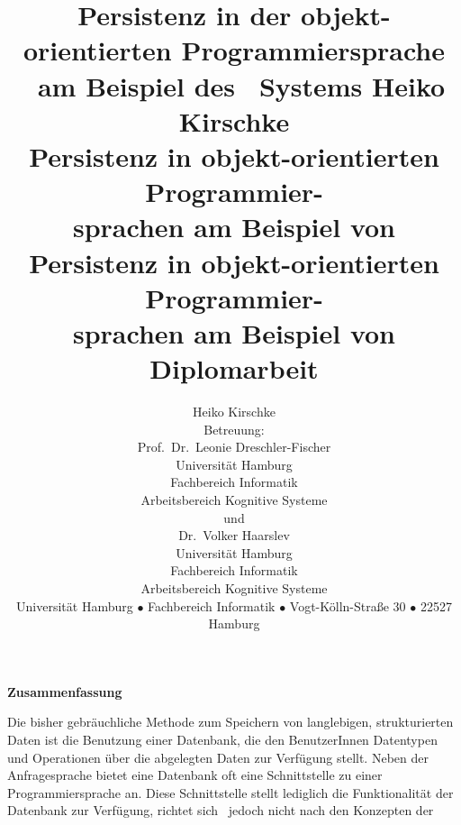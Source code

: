 %
\ifbericht
\title{%
Persistenz in der objekt-orientierten
Programmiersprache \clos\ am Beispiel
des \plob\ Systems}
\else\ifbuch
\title{%
{\large Heiko Kirschke}\\[1.5em]%
Persistenz in objekt-orientierten
Programmier-\\
sprachen am Beispiel von \clos}
\else
\title{%
Persistenz in objekt-orientierten
Programmier-\\
sprachen am Beispiel von \clos%
\\[\bigskipamount]
{\rm\large Diplomarbeit}}
\fi\fi
%
\ifbuch\else\author{%
Heiko Kirschke\ifbericht\else%
\\[3em]
%
Betreuung:\\[\smallskipamount]
Prof.\ Dr.\ Leonie Dreschler-Fischer\\
Universit\"{a}t Hamburg\\
Fachbereich Informatik\\
Arbeitsbereich Kognitive Systeme\\[\smallskipamount]
%
und\\[\smallskipamount]
%
Dr.\ Volker Haarslev\\
Universit\"{a}t Hamburg\\
Fachbereich Informatik\\
Arbeitsbereich Kognitive Systeme\\[\bigskipamount]
%
\vfill%
{\small Universit\"{a}t Hamburg $\bullet$
Fachbereich Informatik $\bullet$
Vogt-K\"{o}lln-Stra\ss{}e 30 $\bullet$
22527 Hamburg}\fi}
\fi%
%
\maketitle
%
\thispagestyle{empty}\clearpage%
%
\ifbuch\else\par\noindent\centerline{\textbf{\Large Zusammenfassung}}
%
\vspace*{\smallskipamount}\par
Die bisher gebr\"{a}uchliche Methode zum Speichern von langlebigen,
strukturierten Daten ist die Benutzung einer Datenbank, die den
BenutzerInnen Datentypen und Operationen \"{u}ber die abgelegten Daten
zur Verf\"{u}gung stellt. Neben der Anfragesprache bietet eine Datenbank
oft eine Schnittstelle zu einer Programmiersprache an. Diese
Schnittstelle stellt lediglich die Funktionalit\"{a}t der Datenbank zur
Verf\"{u}gung, richtet sich \ia\ jedoch nicht nach den Konzepten der
